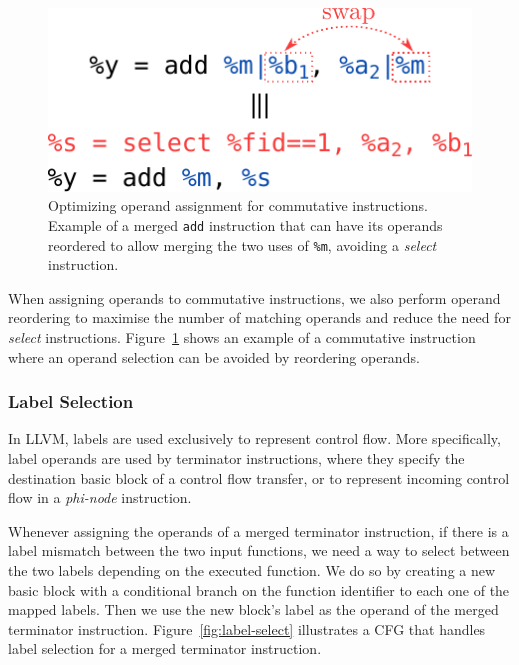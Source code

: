 \begin{figure}[t]
  \centering
  \includegraphics[scale=0.7]{src/merge-operation/figs/operand-select-reorder.pdf}
    \caption{Optimizing operand assignment for commutative instructions.
             Example of a merged \texttt{add} instruction that can have its
             operands reordered to allow merging the two uses of \texttt{\%m},
             avoiding a \textit{select} instruction.}
  \label{fig:operand-select-reorder}
\end{figure}

When assigning operands to commutative instructions, we also perform operand
reordering to maximise the number of matching operands and reduce the need for
\textit{select} instructions.
Figure~\ref{fig:operand-select-reorder} shows an example of a commutative instruction
where an operand selection can be avoided by reordering operands.

\subsubsection{Label Selection} \label{sec:label-select}

In LLVM, labels are used exclusively to represent control flow.
More specifically, label operands are used by terminator instructions, where
they specify the destination basic block of a control flow transfer, or
to represent incoming control flow in a \textit{phi-node} instruction.

Whenever assigning the operands of a merged terminator instruction, if there is
a label mismatch between the two input functions, we need a way to select
between the two labels depending on the executed function.
We do so by creating a new basic block with a conditional branch on the function
identifier to each one of the mapped labels. Then we use the new block's label as
the operand of the merged terminator instruction.
Figure~\ref{fig:label-select} illustrates a CFG that handles label selection for
a merged terminator instruction.

